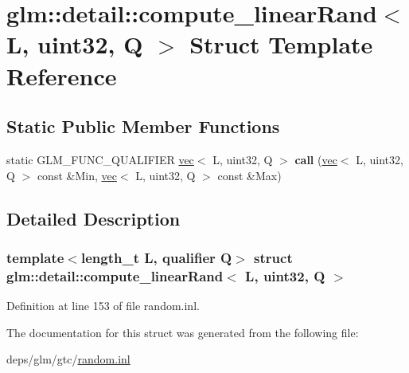\hypertarget{structglm_1_1detail_1_1compute__linearRand_3_01L_00_01uint32_00_01Q_01_4}{}\section{glm\+:\+:detail\+:\+:compute\+\_\+linear\+Rand$<$ L, uint32, Q $>$ Struct Template Reference}
\label{structglm_1_1detail_1_1compute__linearRand_3_01L_00_01uint32_00_01Q_01_4}
\subsection*{Static Public Member Functions}
\begin{DoxyCompactItemize}
\item 
\mbox{\label{structglm_1_1detail_1_1compute__linearRand_3_01L_00_01uint32_00_01Q_01_4_a1375d1a35189e6e1689b6290aa25c17b}} 
static G\+L\+M\+\_\+\+F\+U\+N\+C\+\_\+\+Q\+U\+A\+L\+I\+F\+I\+ER \hyperlink{structglm_1_1vec}{vec}$<$ L, uint32, Q $>$ {\bfseries call} (\hyperlink{structglm_1_1vec}{vec}$<$ L, uint32, Q $>$ const \&Min, \hyperlink{structglm_1_1vec}{vec}$<$ L, uint32, Q $>$ const \&Max)
\end{DoxyCompactItemize}


\subsection{Detailed Description}
\subsubsection*{template$<$length\+\_\+t L, qualifier Q$>$\newline
struct glm\+::detail\+::compute\+\_\+linear\+Rand$<$ L, uint32, Q $>$}



Definition at line 153 of file random.\+inl.



The documentation for this struct was generated from the following file\+:\begin{DoxyCompactItemize}
\item 
deps/glm/gtc/\hyperlink{random_8inl}{random.\+inl}\end{DoxyCompactItemize}
